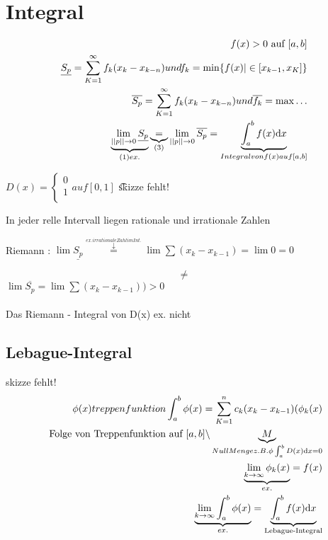 \section{Integral}
\begin{align*}
f(x)>0 \text{ auf } [a,b]\\
\underline{S_p}= \sum_{K=1}^{\infty} f_k (x_k - x_{k-n})und f_k =\min \{ f(x) | \in [x_{k-1},x_K ] \} \\
\overline{S_p}= \sum_{K=1}^{\infty} f_k (x_k - x_{k-n})und \overline{f_k} =\max \dots \\
\underbrace{ \lim\limits_{||p|| \rightarrow 0} \underline{S_p}}_{(1) ex.}\underbrace{=}_{(3)} \lim\limits_{||p|| \rightarrow 0 } \overline{S_p}= \underbrace{\int_a^b f(x) \mathrm{d}x}_{Integral von f(x) auf [a,b]}
\end{align*}
\begin{example}
$ 	D(x)=\begin{cases} 
		0  \\    
		1 \\  
	\end{cases} auf[0,1]$
	 \t{skizze fehlt!}
\end{example}
\begin{remark}
	In jeder relle Intervall liegen rationale und irrationale Zahlen
\end{remark}
Riemann : $\lim \underline{S_p} \overset{\overset{ex. irrationale Zahl im Int.}{\downarrow}}{=} \lim \sum (x_k- x_{k-1})= \lim 0=0$

\[  \neq\]
$\lim \overline{S_p}= \lim \sum (x_k-x_{k-1}))> 0$ \\
 \\ Das Riemann - Integral von D(x) ex. nicht 

\subsection{Lebague-Integral }
 skizze fehlt!\\
\begin{align*}
\phi(x) treppenfunktion \int_a^b \phi(x) = \sum_{K=1}^{n} c_k (x_k - x_{k-1} ) 
(\phi_k (x) \\
\text{ Folge von Treppenfunktion auf } [a,b] \backslash  \underbrace{M}_{NullMenge   z.B.  \phi \int_a^b D(x)\mathrm{d}x=0} \\
\underbrace{\lim\limits_{k \rightarrow \infty} \phi_k (x)}_{ex.}= f(x) \\
\underbrace{\lim\limits_{k \rightarrow \infty} \int_a^b \phi(x)  }_{ex.}=\underbrace{\int_a^b f(x) \mathrm{d}x }_{\text{Lebague-Integral}}
\end{align*}